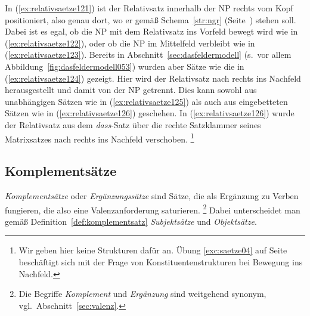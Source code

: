 \Stretch[0.25]

\begin{exe}
  \ex\label{ex:relativsaetze121}
  \begin{xlist}
  \end{xlist}
  \ex\label{ex:relativsaetze124}
  \begin{xlist}
  \end{xlist}
\end{exe}

\Stretch[0.25]

In (\ref{ex:relativsaetze121}) ist der Relativsatz innerhalb der NP rechts vom Kopf positioniert, also genau dort, wo er gemäß Schema~\ref{str:ngr} (Seite~\pageref{str:ngr}) stehen soll.
Dabei ist es egal, ob die NP mit dem Relativsatz ins Vorfeld bewegt wird wie in (\ref{ex:relativsaetze122}), oder ob die NP im Mittelfeld verbleibt wie in (\ref{ex:relativsaetze123}).
Bereits in Abschnitt~\ref{sec:dasfeldermodell} (s.\ vor allem Abbildung~\ref{fig:dasfeldermodell053}) wurden aber Sätze wie die in (\ref{ex:relativsaetze124}) gezeigt.
Hier wird der Relativsatz nach rechts ins Nachfeld herausgestellt und damit von der NP getrennt.
Dies kann sowohl aus unabhängigen Sätzen wie in (\ref{ex:relativsaetze125}) als auch aus eingebetteten Sätzen wie in (\ref{ex:relativsaetze126}) geschehen.
In (\ref{ex:relativsaetze126}) wurde der Relativsatz aus dem \textit{dass}-Satz über die rechte Satzklammer seines Matrixsatzes nach rechts ins Nachfeld verschoben.%
\footnote{Wir geben hier keine Strukturen dafür an.
Übung \ref{exc:saetze04} auf Seite~\pageref{exc:saetze04} beschäftigt sich mit der Frage von Konstituentenstrukturen bei Bewegung ins Nachfeld.}

\Stretch[2]

\subsection{Komplementsätze}
\label{sec:komplementsaetze}

\textit{Komplementsätze} oder \textit{Ergänzungssätze} sind Sätze, die als Ergänzung zu Verben fungieren, die also eine Valenzanforderung saturieren.%
\footnote{Die Begriffe \textit{Komplement} und \textit{Ergänzung} sind weitgehend synonym, vgl.\ Abschnitt~\ref{sec:valenz}.}
Dabei unterscheidet man gemäß Definition~\ref{def:komplementsatz} \textit{Subjektsätze} und \textit{Objektsätze}.

